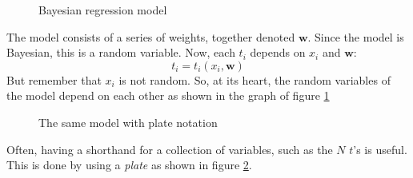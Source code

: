 \documentclass[12pt, a4paper]{article}
\numberwithin{equation}{section}
\begin{document}
\begin{figure}
\centering
{}
\caption{Bayesian regression model}
\label{graph:bayesian_regression}
\end{figure}

The model consists of a series of weights, together denoted $\mathbf{w}$. Since the model is Bayesian, this is a random variable. Now, each $t_i$ depends on $x_i$ and $\mathbf{w}$:
\begin{equation}
t_i=t_i(x_i,\mathbf{w})
\end{equation}
But remember that $x_i$ is not random. So, at its heart, the random variables of the model depend on each other as shown in the graph of figure \ref{graph:bayesian_regression}

\begin{figure}
\centering
{}
\caption{The same model with plate notation}
\label{graph:bayesian_regression_plate}
\end{figure}
	
Often, having a shorthand for a collection of variables, such as the $N$ $t$'s is useful. This is done by using a \textit{plate} as shown in figure \ref{graph:bayesian_regression_plate}.
\end{document}
